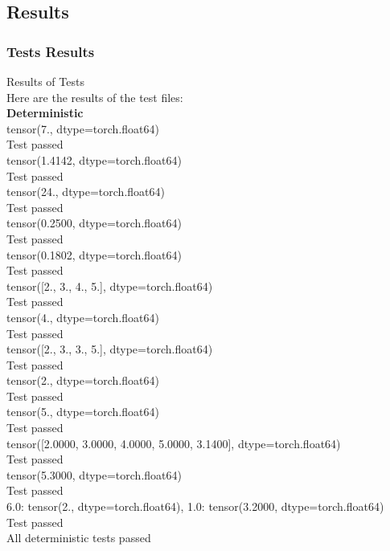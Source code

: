 \documentclass{article}
\def\blu#1{{\color{blu}#1}}
\begin{document}
\subsection{Results}
\subsubsection{Tests Results}
\blu{Results of Tests}\\
Here are the results of the test files:\\
\textbf{Deterministic}\\
tensor(7., dtype=torch.float64)\\
Test passed\\
tensor(1.4142, dtype=torch.float64)\\
Test passed\\
tensor(24., dtype=torch.float64)\\
Test passed\\
tensor(0.2500, dtype=torch.float64)\\
Test passed\\
tensor(0.1802, dtype=torch.float64)\\
Test passed\\
tensor([2., 3., 4., 5.], dtype=torch.float64)\\
Test passed\\
tensor(4., dtype=torch.float64)\\
Test passed\\
tensor([2., 3., 3., 5.], dtype=torch.float64)\\
Test passed\\
tensor(2., dtype=torch.float64)\\
Test passed\\
tensor(5., dtype=torch.float64)\\
Test passed\\
tensor([2.0000, 3.0000, 4.0000, 5.0000, 3.1400], dtype=torch.float64)\\
Test passed\\
tensor(5.3000, dtype=torch.float64)\\
Test passed\\
{6.0: tensor(2., dtype=torch.float64), 1.0: tensor(3.2000, dtype=torch.float64)}\\
Test passed\\
All deterministic tests passed\\
\pagebreak
\end{document}
